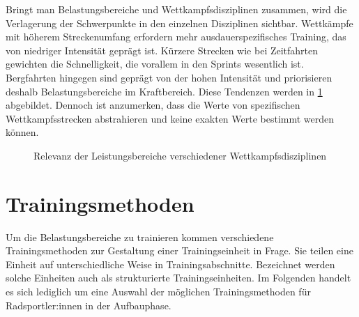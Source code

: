 Bringt man Belastungsbereiche und Wettkampfsdisziplinen zusammen, wird die Verlagerung der Schwerpunkte in den einzelnen Disziplinen sichtbar. Wettkämpfe mit höherem Streckenumfang erfordern mehr ausdauerspezifisches Training, das von niedriger Intensität geprägt ist. Kürzere Strecken wie bei Zeitfahrten gewichten die Schnelligkeit, die vorallem in den Sprints wesentlich ist. Bergfahrten hingegen sind geprägt von der hohen Intensität und priorisieren deshalb Belastungsbereiche im Kraftbereich. Diese Tendenzen werden in  \ref{fig:wettkampfLeistungsbereiche} abgebildet. Dennoch ist anzumerken, dass die Werte von spezifischen Wettkampfsstrecken abstrahieren und keine exakten Werte bestimmt werden können. 
\begin{figure}[hb]
    \centering
    \caption{Relevanz der Leistungsbereiche verschiedener Wettkampfsdisziplinen \cite[30]{Radsporttraining}}
    \label{fig:wettkampfLeistungsbereiche}
\end{figure}
\section{Trainingsmethoden}
\label{grundlagen:methoden}
Um die Belastungsbereiche zu trainieren kommen verschiedene Trainingsmethoden zur Gestaltung einer Trainingseinheit in Frage. Sie teilen eine Einheit auf unterschiedliche Weise in Trainingsabschnitte. Bezeichnet werden solche Einheiten auch als strukturierte Trainingseinheiten. Im Folgenden handelt es sich lediglich um eine Auswahl der möglichen Trainingsmethoden für Radsportler:innen in der Aufbauphase.\cite[40-43]{Radsporttraining}
